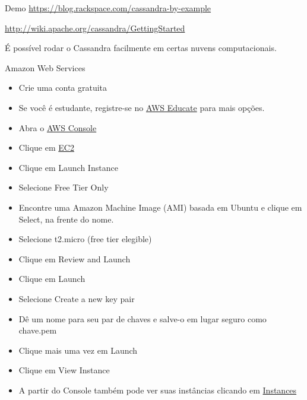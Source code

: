 \begin{frame}{Demo}
\url{https://blog.rackspace.com/cassandra-by-example}

\url{http://wiki.apache.org/cassandra/GettingStarted}	
\end{frame}

É possível rodar o Cassandra facilmente em certas nuvens computacionais.


\begin{frame}[allowframebreaks]{Amazon Web Services}
\begin{itemize}
\item Crie uma conta gratuita

\item Se você é estudante, registre-se no \href{https://www.awseducate.com/Registration}{AWS Educate} para mais opções.

\item Abra o \href{https://console.aws.amazon.com/console/home}{AWS Console}

\item Clique em \href{https://console.aws.amazon.com/ec2/}{EC2}

\item Clique em Launch Instance

\item Selecione Free Tier Only

\framebreak

\item Encontre uma Amazon Machine Image (AMI) basada em Ubuntu e clique em Select, na frente do nome.

\item Selecione t2.micro (free tier elegible)

\item Clique em Review and Launch

\item Clique em Launch

\item Selecione Create a new key pair

\item Dê um nome para seu par de chaves e salve-o em lugar seguro como chave.pem

\item Clique mais uma vez em Launch

\item Clique em View Instance

\item A partir do Console também pode ver suas instâncias clicando em \href{https://console.aws.amazon.com/ec2/v2/home?region=us-east-1\#Instances:}{Instances}
\end{itemize}
\end{frame}

